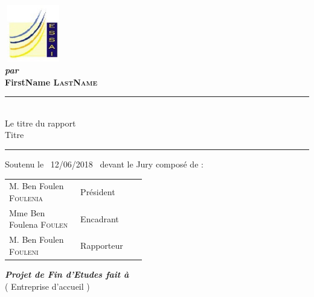 \documentclass[a4paper, oneside, frenchb]{report}
\newcommand{\reportAuthor} {%
  FirstName \textsc{LastName}%
}
\newcommand{\reportSubject} {%
  Le titre du rapport \\ Titre%
}
\newcommand{\dateSoutenance} {%
  12/06/2018%
}
\newcommand{\studyDepartment} {%
  Entreprise d'accueil %
}
\newcommand{\juryPresident} {%
  M. Ben Foulen \textsc{Foulenia}%
}
\newcommand{\juryPresidentDesc} {%
  Pr\'esident%
}
\newcommand{\juryMemberOne} {%
  Mme Ben Foulena \textsc{Foulen}%
}
\newcommand{\juryMemberOneDesc} {%
  Encadrant %
}
\newcommand{\juryMemberTwo} {%
  M. Ben Foulen \textsc{Fouleni}%
}
\newcommand{\juryMemberTwoDesc} {%
  Rapporteur%
}
\begin{document}
\begin{titlepage}
\begin{center}
\includegraphics[width=2.5cm, height=2.5cm]{logo-essai.jpg}\\

\vspace{30pt}
\textbf{\textit{par}}\\
\vspace{10pt} {%
  \fontsize{18pt}{18pt}\selectfont%
  \textbf{\reportAuthor}\\
}%

\vspace{10pt} {%
  \renewcommand*{\familydefault}{\defaultFont}
  \fontsize{27pt}{27pt}\selectfont%
  \rule{0.5\textwidth}{.4pt}\\
  \vspace{10pt}
  \reportSubject{}\\%
  \vspace{10pt}
  \rule{0.5\textwidth}{.4pt}
}

\vspace{10pt}
Soutenu le~\dateSoutenance~devant le Jury compos\'e de :\\
\vspace{20pt}
\begin{tabular}{p{0.3\linewidth} p{0.15\linewidth}}
  \juryPresident{} & \juryPresidentDesc{}\\
  \juryMemberOne{} & \juryMemberOneDesc{}\\
  \juryMemberTwo{} & \juryMemberTwoDesc{}\\
\end{tabular}

\vfill

\vspace{30pt}%
\textbf{\textit{Projet de Fin d'Etudes fait \`a}}\\

\vspace{10pt}
(\studyDepartment)\\

\end{center}
\end{titlepage}
\end{document}
